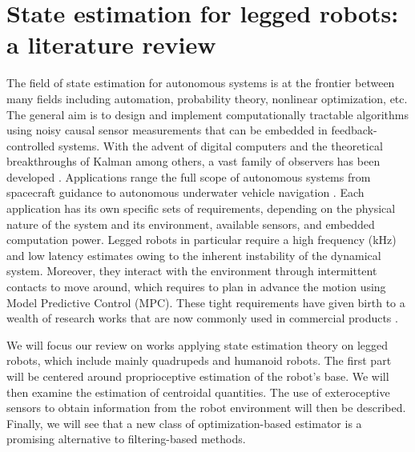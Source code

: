 \chapter{State estimation for legged robots: a literature review}
%
The field of state estimation for autonomous systems is at the frontier between many fields including automation, probability theory, nonlinear optimization, etc.
The general aim is to design and implement computationally tractable algorithms using noisy causal sensor measurements that can be embedded in feedback-controlled systems.
With the advent of digital computers and the theoretical breakthroughs of Kalman \cite{kalman1960new} among others, a vast family of observers has been developed 
\cite{smith1962application, bellantoni1967square, wan2001unscented, thrun2004simultaneous}. Applications range the full scope of autonomous systems from spacecraft guidance \cite{mcgee1985discovery} 
to autonomous underwater vehicle navigation \cite{leonard2016autonomous}. Each application has its own specific sets of requirements, depending on the physical
nature of the system and its environment, available sensors, and embedded computation power. Legged robots in particular require a high frequency (kHz) 
and low latency estimates owing to the inherent instability of the dynamical system. Moreover, they interact with the environment through 
intermittent contacts to move around, which requires to plan in advance the motion using Model Predictive Control (MPC). These tight requirements 
have given birth to a wealth of research works that are now commonly used in commercial products \cite{hutter2016anymal}.

We will focus our review on works applying state estimation theory on legged robots, which include mainly quadrupeds and humanoid robots. The first part will 
be centered around proprioceptive estimation of the robot's base. We will then examine the estimation of centroidal quantities. The use of exteroceptive sensors
to obtain information from the robot environment will then be described. Finally, we will see that a new class of optimization-based estimator is a promising alternative
to filtering-based methods.

